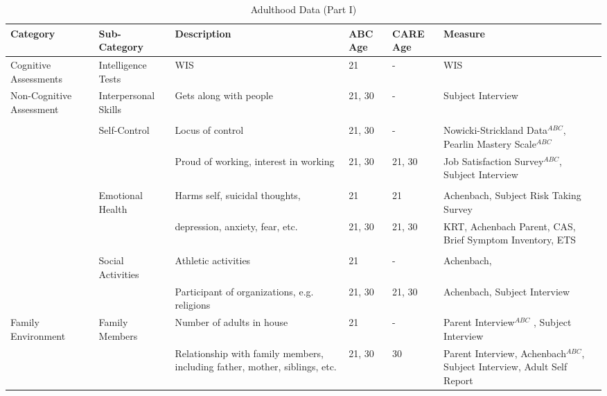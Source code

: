 \begin{sidewaystable}[H]							
\begin{threeparttable}								
\small										
\caption{Adulthood Data (Part I)} \label{tab:adultvars_1}						\centering										
\scriptsize										
\begin{tabular}{L{3.5cm} C{3.5cm} C{5cm} C{1.5cm} C{1.8cm} C{6cm}}										
\toprule
\textbf{Category}	&	\textbf{Sub-Category}	&	\textbf{Description}	&	\textbf{ABC Age}  	&  \textbf{CARE Age}  & 	\textbf{Measure}	\\ \midrule
Cognitive Assessments   	&	       Intelligence Tests      	&	       WIS     	&	21	&	-	&	       WIS     \\
\midrule										
Non-Cognitive Assessment        	&	       Interpersonal Skills    	&	       Gets along with people  	&	       21, 30  	&	-	&	       Subject Interview   \\
\\										
        	&	       Self-Control    	&	       Locus of control        	&	       21, 30  	&	-	&	       Nowicki-Strickland Data$^{ABC}$, Pearlin Mastery Scale$^{ABC}$  \\
        	&	               	&	       Proud of working, interest in working   	&	       21, 30  	&	21, 30	&	       Job Satisfaction Survey$^{ABC}$, Subject Interview       \\
\\										
        	&	       Emotional Health        	&	       Harms self, suicidal thoughts,	&	21	&	21	&	       Achenbach,  Subject Risk Taking Survey   \\
        	&	               	&	       depression, anxiety, fear, etc. 	&	       21, 30  	&	21, 30	&	       KRT, Achenbach Parent,  CAS, Brief Symptom Inventory, ETS\\
\\										
        	&	       Social Activities       	&	       Athletic activities     	&	21	&	-	&	       Achenbach,  \\
        	&	               	&	       Participant of organizations, e.g. religions    	&	       21, 30  	&	21, 30	&	       Achenbach, Subject Interview        \\
\midrule										
Family Environment      	&	       Family Members  	&	       Number of adults in house       	&	21	&	-	&	       Parent Interview$^{ABC}$ , Subject Interview    \\
        	&	               	&	       Relationship with family members, including father, mother, siblings, etc.      	&	       21, 30  	&	30	&	      Parent Interview, Achenbach$^{ABC}$, Subject Interview, Adult Self Report \\

\end{tabular}
\end{threeparttable}
\end{sidewaystable}
